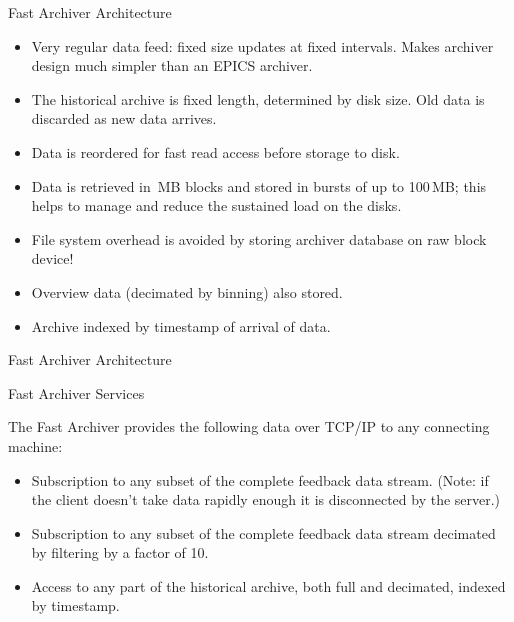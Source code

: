 \documentclass{beamer}
\begin{document}
%
\begin{frame}{Fast Archiver Architecture}

\begin{itemize}

\item Very regular data feed: fixed size updates at fixed intervals.
Makes archiver design much simpler than an EPICS archiver.

\item The historical archive is fixed length, determined by disk size.  Old data
is discarded as new data arrives.

\item Data is reordered for fast read access before storage to disk.

\item Data is retrieved in \textonehalf\,MB blocks and stored in bursts of up to
100\,MB; this helps to manage and reduce the sustained load on the disks.

\item File system overhead is avoided by storing archiver database on raw block
device!

\item Overview data (decimated by binning) also stored.

\item Archive indexed by timestamp of arrival of data.

\end{itemize}
\end{frame}


%
\begin{frame}{Fast Archiver Architecture}

\end{frame}


%
\begin{frame}{Fast Archiver Services}

The Fast Archiver provides the following data over TCP/IP to any connecting
machine:

\begin{itemize}

\item Subscription to any subset of the complete feedback data stream.  (Note:
if the client doesn't take data rapidly enough it is disconnected by the
server.)

\item Subscription to any subset of the complete feedback data stream decimated
by filtering by a factor of 10.

\item Access to any part of the historical archive, both full and decimated,
indexed by timestamp.

\end{itemize}
\end{frame}
\end{document}
